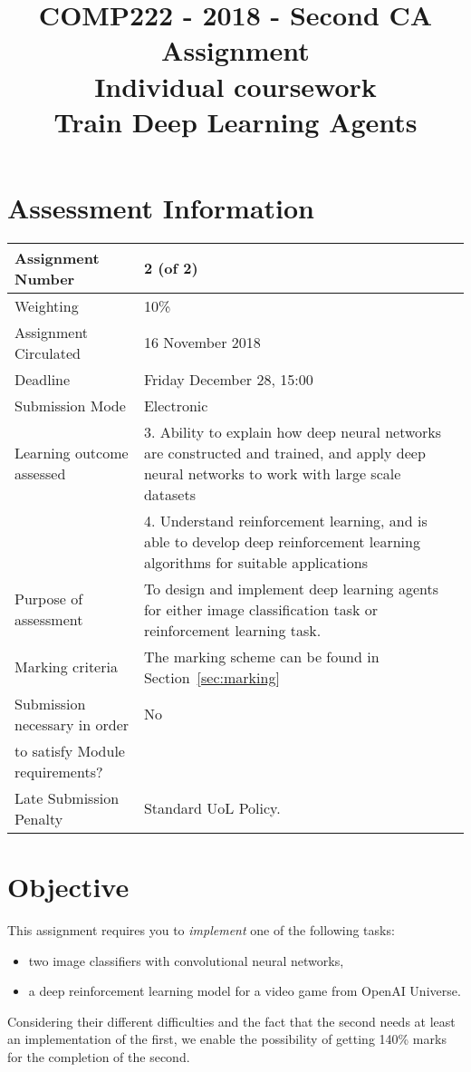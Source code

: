 \documentclass[12pt,a4]{article}
\title{COMP222 - 2018 - Second CA Assignment\\
Individual coursework\\
Train Deep Learning Agents}
\date{}
\author{}
\begin{document}
\maketitle

\section*{Assessment Information}
\begin{table}[htb]
\begin{tabular}{|l|p{}|}\hline
Assignment Number               & 2 (of 2)\\ \hline
Weighting                       & 10\%\\ \hline
Assignment Circulated           & 16 November 2018\\ \hline
Deadline                        & Friday December 28,  15:00\\ \hline
Submission Mode                 & Electronic\\ \hline
Learning outcome assessed       & 3.	Ability to explain how deep neural networks are constructed and trained, and apply deep neural networks to work with large scale datasets \\ 
& 4.	Understand reinforcement learning, and is able to develop deep reinforcement learning algorithms for suitable applications
\\
 \hline
Purpose of assessment           & To design and implement deep learning agents for either image classification task or reinforcement learning task.  \\ \hline
Marking criteria                & The marking scheme can be found in Section~\ref{sec:marking}\\ \hline
Submission necessary in order   &  No\\
to satisfy Module requirements? & \\ \hline
Late Submission Penalty         & Standard UoL Policy.\\ \hline
\end{tabular}
\end{table}



\newpage


\section{Objective}
This assignment requires you to \emph{implement}  one of the following tasks: 
\begin{itemize}
\item two image classifiers with convolutional neural networks, 
\item a deep reinforcement learning model for a video game from OpenAI Universe.
\end{itemize}
Considering their different difficulties and the fact that the second needs at least an implementation of the first, we 
enable the possibility of getting 140\% marks for the completion of the second.  
\end{document}

